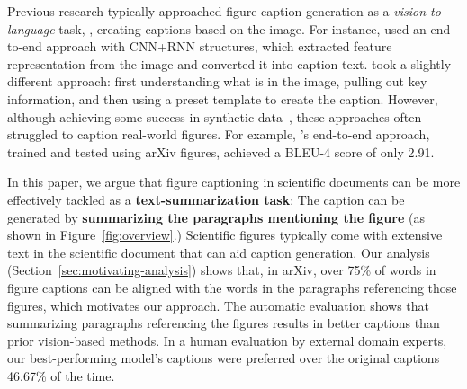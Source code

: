 Previous research typically approached figure caption generation as a \textit{vision-to-language} task, \ie, creating captions based on the image.
For instance, \citet{hsu-etal-2021-scicap-generating} used an end-to-end approach with CNN+RNN structures, which extracted feature representation from the image and converted it into caption text. 
\citet{qian2021generating} took a slightly different approach: first understanding what is in the image, pulling out key information, and then using a preset template to create the caption.
However, although achieving some success in synthetic data~\cite{kahou2017figureqa,kafle2018dvqa,chen2019figure,zhu2021autochart}, these approaches often struggled to caption real-world figures.
For example, \citet{hsu-etal-2021-scicap-generating}'s end-to-end approach, trained and tested using arXiv figures, achieved a BLEU-4 score of only 2.91.

In this paper, we argue that figure captioning in scientific documents can be more effectively tackled as a \textbf{text-summarization task}: 
The caption can be generated by \textbf{summarizing the paragraphs mentioning the figure} (as shown in Figure~\ref{fig:overview}.)
Scientific figures typically come with extensive text in the scientific document that can aid caption generation.
Our analysis (Section~\ref{sec:motivating-analysis}) shows that, in arXiv, over 75\% of words in figure captions can be aligned with the words in the paragraphs referencing those figures, which motivates our approach.
The automatic evaluation shows that summarizing paragraphs referencing the figures results in better captions than prior vision-based methods.
In a human evaluation by external domain experts, our best-performing model's captions were preferred over the original captions 46.67\% of the time.

